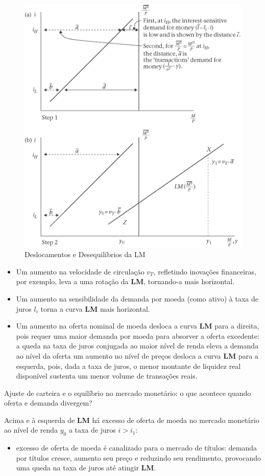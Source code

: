 \documentclass[a4paper,12pt]{article}[abntex2]
\begin{document}
\begin{figure}[H]
    \centering
    \caption{Deslocamentos e Desequilíbrios da LM}
    \includegraphics[width=0.75\linewidth]{Imagens/a3i2.png}
\end{figure}

\begin{itemize}
    \item Um aumento na velocidade de circulação $v_T$, refletindo inovações financeiras, por exemplo, leva a uma rotação da \textbf{LM}, tornando-a mais horizontal.
    
    \item Um aumento na sensibilidade da demanda por moeda (como ativo) à taxa de juros $l_i$ torna a curva \textbf{LM} mais horizontal.
    
    \item Um aumento na oferta nominal de moeda desloca a curva \textbf{LM} para a direita, pois requer uma maior demanda por moeda para absorver a oferta excedente: a queda na taxa de juros conjugada ao maior nível de renda eleva a demanda ao nível da oferta um aumento no nível de preços desloca a curva \textbf{LM} para a esquerda, pois, dada a taxa de juros, o menor montante de liquidez real disponível sustenta um menor volume de transações reais.
\end{itemize}

Ajuste de carteira e o equilíbrio no mercado monetário: o que acontece quando oferta e demanda divergem?

Acima e à esquerda de \textbf{LM} há excesso de oferta de moeda no mercado monetário ao nível de renda $y_0$ a taxa de juros $i > i_1$:\begin{itemize}
    \item excesso de oferta de moeda é canalizado para o mercado de títulos: demanda por títulos cresce, aumento seu preço e reduzindo seu rendimento, provocando uma queda na taxa de juros até atingir \textbf{LM}.
\end{itemize}
\end{document}
